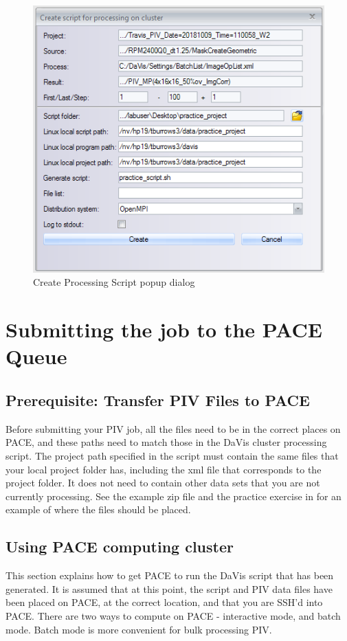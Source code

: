 \documentclass{article}
\begin{document}
\begin{enumerate}
			\begin{figure}[h!]
				\centering
				\includegraphics[width=5in]{./cluster_script_processing.png} 
				\caption{Create Processing Script popup dialog}
			\end{figure}
	\end{enumerate}

	\section{Submitting the job to the PACE Queue}
	\subsection{Prerequisite: Transfer PIV Files to PACE}
	Before submitting your PIV job, all the files need to be in the correct places on PACE, and these paths need to match those in the DaVis cluster processing script.  The project path specified in the script must contain the same files that your local project folder has, including the xml file that corresponds to the project folder.  It does not need to contain other data sets that you are not currently processing.  See the example zip file and the practice exercise in  for an example of where the files should be placed.
	
	\subsection{Using PACE computing cluster}
	This section explains how to get PACE to run the DaVis script that has been generated.  It is assumed that at this point, the script and PIV data files have been placed on PACE, at the correct location, and that you are SSH'd into PACE.  There are two ways to compute on PACE - interactive mode, and batch mode.  Batch mode is more convenient for bulk processing PIV.
	
\end{document}
